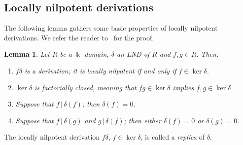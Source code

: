 \documentclass[a4paper,reqno,12pt]{amsart}
\theoremstyle{plain}
\theoremstyle{definition}
\newtheorem{definition}[theorem]{Definition}
\theoremstyle{plain}
\newtheorem{lemma}[theorem]{Lemma}
\theoremstyle{remark}
\newcommand{\kk}{\Bbbk}
\begin{document}
\subsection*{Locally nilpotent derivations}
The following lemma gathers some basic properties of locally nilpotent derivations. We refer the reader to~\cite[Principles 1, 5, and 7 and Corollary 1.23]{Freu} for the proof.

\begin{lemma}\label{BasicLem}
    Let $R$ be a $\kk$-domain, $\delta$ an LND of $R$ and $f, g \in R.$ Then:
    \begin{enumerate} 
    \item[$(i)$] $f\delta$ is a derivation; it is locally nilpotent if and only if $f\in\ker\delta$.
    \item[$(ii)$] $\ker\delta$ is factorially closed, meaning that $fg \in \ker\delta$ implies $f, g\in\ker\delta$.
    \item[$(iii)$] Suppose that $f\, | \, \delta(f)$; then $\delta(f)=0$.
    \item[$(iv)$] Suppose that $f\, | \, \delta(g)$ and $g\, | \, \delta(f)$; then either $\delta(f)=0$ or $\delta(g)=0$.
    \end{enumerate} 
\end{lemma}
The locally nilpotent derivation $f\delta$, $f\in \ker\delta$, is called a \emph{replica} of $\delta$.
\end{document}
